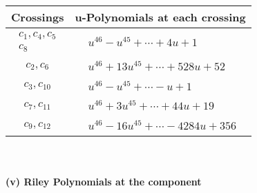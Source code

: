 \documentclass[1p]{elsarticle_modified}
\theoremstyle{definition}
\begin{document}
\begin{tabular}{m{50pt}|m{274pt}}
Crossings & \hspace{64pt}u-Polynomials at each crossing \\
\hline $$\begin{aligned}c_{1},c_{4},c_{5}\\c_{8}\end{aligned}$$&$\begin{aligned}
&u^{46}- u^{45}+\cdots+4 u+1
\end{aligned}$\\
\hline $$\begin{aligned}c_{2},c_{6}\end{aligned}$$&$\begin{aligned}
&u^{46}+13 u^{45}+\cdots+528 u+52
\end{aligned}$\\
\hline $$\begin{aligned}c_{3},c_{10}\end{aligned}$$&$\begin{aligned}
&u^{46}- u^{45}+\cdots- u+1
\end{aligned}$\\
\hline $$\begin{aligned}c_{7},c_{11}\end{aligned}$$&$\begin{aligned}
&u^{46}+3 u^{45}+\cdots+44 u+19
\end{aligned}$\\
\hline $$\begin{aligned}c_{9},c_{12}\end{aligned}$$&$\begin{aligned}
&u^{46}-16 u^{45}+\cdots-4284 u+356
\end{aligned}$\\
\hline
\end{tabular}\\~\\
\newpage\renewcommand{\arraystretch}{1}
\flushleft \textbf{(v) Riley Polynomials at the component}\newline \\
\end{document}

